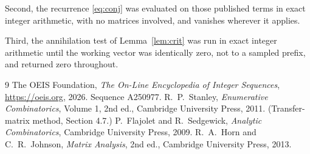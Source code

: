 \documentclass[11pt,a4paper]{article}
\theoremstyle{plain}
\theoremstyle{definition}
\begin{document}
Second, the recurrence \eqref{eq:conj} was evaluated on those published terms in exact
integer arithmetic, with no matrices involved, and vanishes wherever it applies.

Third, the annihilation test of Lemma~\ref{lem:crit} was run in exact integer arithmetic
until the working vector was identically zero, not to a sampled prefix, and returned zero
throughout.

\begin{thebibliography}{9}
 The OEIS Foundation, \emph{The On-Line Encyclopedia of Integer
Sequences}, \url{https://oeis.org}, 2026. Sequence A250977.
 R.~P.~Stanley, \emph{Enumerative Combinatorics}, Volume 1, 2nd ed.,
Cambridge University Press, 2011. (Transfer-matrix method, Section 4.7.)
 P.~Flajolet and R.~Sedgewick, \emph{Analytic Combinatorics}, Cambridge
University Press, 2009.
 R.~A.~Horn and C.~R.~Johnson, \emph{Matrix Analysis}, 2nd ed., Cambridge
University Press, 2013.
\end{thebibliography}
\end{document}
